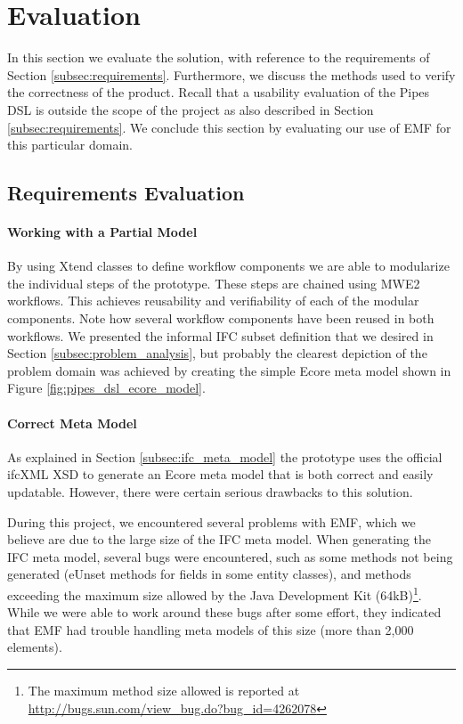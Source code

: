\section{Evaluation}
\label{sec:evaluation}
In this section we evaluate the solution, with reference to the requirements of Section \ref{subsec:requirements}. Furthermore, we discuss the methods used to verify the correctness of the product. Recall that a usability evaluation of the Pipes DSL is outside the scope of the project as also described in Section \ref{subsec:requirements}. We conclude this section by evaluating our use of EMF for this particular domain.


\subsection{Requirements Evaluation}
\label{subsec:requirements_evaluation}
\paragraph{Working with a Partial Model} By using Xtend classes to define workflow components we are able to modularize the individual steps of the prototype. These steps are chained using MWE2 workflows. This achieves reusability and verifiability of each of the modular components. Note how several workflow components have been reused in both workflows. We presented the informal IFC subset definition that we desired in Section \ref{subsec:problem_analysis}, but probably the clearest depiction of the problem domain was achieved by creating the simple Ecore meta model shown in Figure \ref{fig:pipes_dsl_ecore_model}.

\paragraph{Correct Meta Model} As explained in Section \ref{subsec:ifc_meta_model} the prototype uses the official ifcXML XSD to generate an Ecore meta model that is both correct and easily updatable. However, there were certain serious drawbacks to this solution.

During this project, we encountered several problems with EMF, which we believe are due to the large size of the IFC meta model. When generating the IFC meta model, several bugs were encountered, such as some methods not being generated (eUnset methods for fields in some entity classes), and methods exceeding the maximum size allowed by the Java Development Kit (64kB)\footnote{The maximum method size allowed is reported at \url{http://bugs.sun.com/view_bug.do?bug_id=4262078}}. While we were able to work around these bugs after some effort, they indicated that EMF had trouble handling meta models of this size (more than 2,000 elements).

